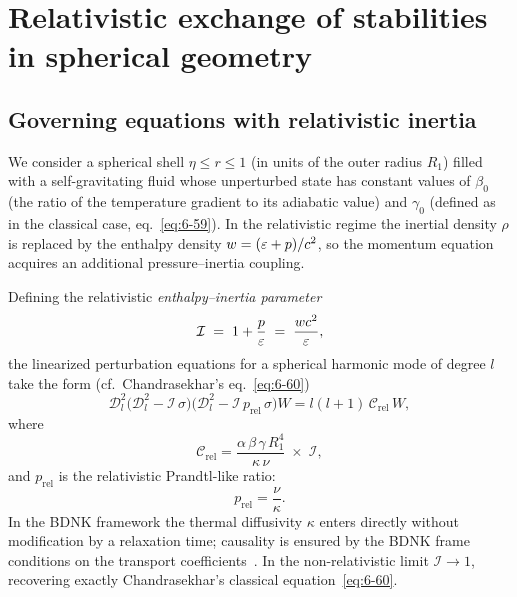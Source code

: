 \section{Relativistic exchange of stabilities in spherical geometry}
\label{sec:rel-57}

\subsection{Governing equations with relativistic inertia}
\label{sec:rel-57-gov}

We consider a spherical shell $\eta \leq r \leq 1$ (in units of the
outer radius $R_{1}$) filled with a self-gravitating fluid whose
unperturbed state has constant values of $\beta_{0}$ (the ratio of the
temperature gradient to its adiabatic value) and $\gamma_{0}$ (defined
as in the classical case, eq.~\eqref{eq:6-59}).  In the relativistic
regime the inertial density $\rho$ is replaced by the enthalpy density
$w = (\varepsilon + p)/c^{2}$, so the momentum equation
acquires an additional pressure--inertia coupling.

Defining the relativistic \emph{enthalpy--inertia parameter}
\begin{equation}
  \mathcal{I} \;=\; 1 + \frac{p}{\varepsilon}
  \;=\; \frac{w c^{2}}{\varepsilon},
  \label{eq:rel-inertia-param}
\end{equation}
the linearized perturbation equations for a spherical harmonic mode of
degree $l$ take the form (cf.\ Chandrasekhar's eq.~\eqref{eq:6-60})
\begin{equation}
  \mathscr{D}_{l}^{2}\!\bigl(\mathscr{D}_{l}^{2}
    - \mathcal{I}\,\sigma\bigr)
  \bigl(\mathscr{D}_{l}^{2}
    - \mathcal{I}\,p_{\mathrm{rel}}\,\sigma\bigr)W
  = l(l+1)\,\mathcal{C}_{\mathrm{rel}}\,W,
  \label{eq:rel-6-60}
\end{equation}
where
\begin{equation}
  \mathcal{C}_{\mathrm{rel}}
  = \frac{\alpha\,\beta\,\gamma\,R_{1}^{4}}{\kappa\,\nu}
    \;\times\;\mathcal{I},
  \label{eq:rel-C}
\end{equation}
and $p_{\mathrm{rel}}$ is the relativistic Prandtl-like ratio:
\begin{equation}
  p_{\mathrm{rel}} = \frac{\nu}{\kappa}.
  \label{eq:rel-Prandtl}
\end{equation}
In the BDNK framework the thermal diffusivity $\kappa$ enters directly
without modification by a relaxation time; causality is ensured by the
BDNK frame conditions on the transport
coefficients~\cite{BemficaDN2018,Kovtun2019}.
In the non-relativistic limit $\mathcal{I} \to 1$,
recovering exactly Chandrasekhar's classical equation~\eqref{eq:6-60}.

